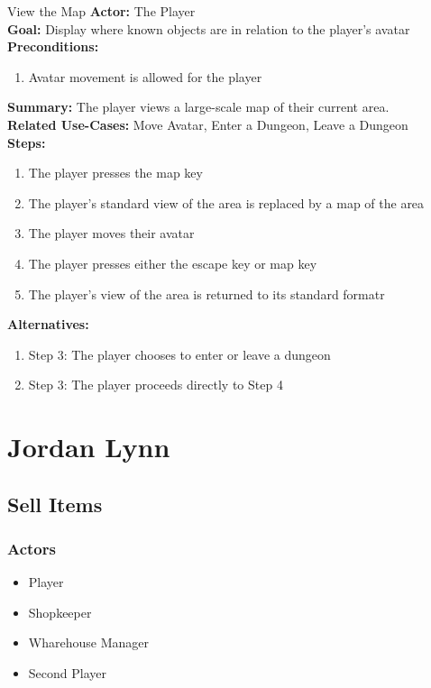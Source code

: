 \documentclass[12pt]{report}
\begin{document}
\begin{subsection}{View the Map}
\textbf{Actor:} The Player \\
\textbf{Goal:} Display where known objects are in relation to the player's avatar \\
\textbf{Preconditions:} 
\begin{enumerate}
	\item Avatar movement is allowed for the player
\end{enumerate}
\textbf{Summary:} The player views a large-scale map of their current area. \\
\textbf{Related Use-Cases:} Move Avatar, Enter a Dungeon, Leave a Dungeon \\
\textbf{Steps:}
\begin{enumerate}
	\item The player presses the map key
	\item The player's standard view of the area is replaced by a map of the area
	\item The player moves their avatar
	\item The player presses either the escape key or map key
	\item The player's view of the area is returned to its standard formatr
\end{enumerate}
\textbf{Alternatives:} 
\begin{enumerate}
	\item Step 3: The player chooses to enter or leave a dungeon
	\item Step 3: The player proceeds directly to Step 4
\end{enumerate}
\end{subsection}




\section{Jordan Lynn}
    \subsection{Sell Items}
    
    \subsubsection{Actors}
    \begin{itemize}
        \item Player
        \item Shopkeeper
        \item Wharehouse Manager
        \item Second Player
    \end{itemize}
\end{document}
